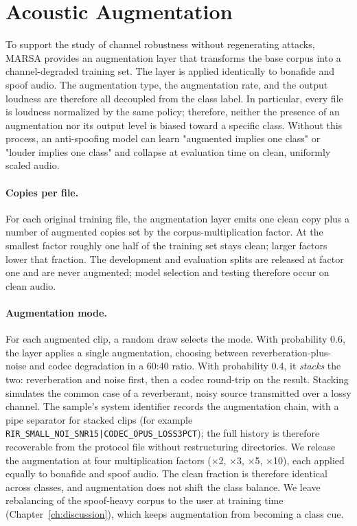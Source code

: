 \documentclass[11pt]{report}
\begin{document}
\section{Acoustic Augmentation}
\label{sec:augmentation}

To support the study of channel robustness without regenerating attacks,
MARSA provides an augmentation layer that transforms the base corpus
into a channel-degraded training set. The layer is applied identically
to bonafide and spoof audio. The augmentation type, the augmentation
rate, and the output loudness are therefore all decoupled from the class
label. In particular, every file is loudness normalized by the same
policy; therefore, neither the presence of an augmentation nor its output level
is biased toward a specific class. Without this process, an
anti-spoofing model can learn "augmented implies one class" or "louder
implies one class" and collapse at evaluation time on clean, uniformly
scaled audio.

\paragraph{Copies per file.} For each original training file, the
augmentation layer emits one clean copy plus a number of augmented
copies set by the corpus-multiplication factor. At the smallest factor
roughly one half of the training set stays clean; larger factors lower
that fraction. The development and evaluation splits are released at
factor one and are never augmented; model selection and testing therefore occur
on clean audio.

\paragraph{Augmentation mode.} For each augmented clip, a
random draw selects the mode. With probability 0.6, the layer applies a
single augmentation, choosing between reverberation-plus-noise and codec
degradation in a 60:40 ratio. With probability 0.4, it \emph{stacks} the
two: reverberation and noise first, then a codec round-trip on the
result. Stacking simulates the common case of a reverberant, noisy source
transmitted over a lossy channel. The sample's system identifier records
the augmentation chain, with a pipe separator for stacked clips (for
example \texttt{RIR\_SMALL\_NOI\_SNR15|CODEC\_OPUS\_LOSS3PCT}); the full
history is therefore recoverable from the protocol file without restructuring
directories. We release the augmentation at four multiplication factors
($\times$2, $\times$3, $\times$5, $\times$10), each applied equally to
bonafide and spoof audio. The clean fraction is therefore identical
across classes, and augmentation does not shift the class balance. We
leave rebalancing of the spoof-heavy corpus to the user at training time
(Chapter~\ref{ch:discussion}), which keeps augmentation from becoming a
class cue.
\end{document}
